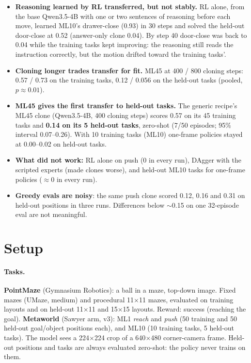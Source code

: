 \documentclass[11pt]{article}
\begin{document}
\begin{itemize}
  (ML10 rollouts 0.49 $\to$ 0.64 over 50 steps), but not held-out positions or tasks. Positive-only advantages hurt.
\item \textbf{Reasoning learned by RL transferred, but not stably.} RL alone, from the base Qwen3.5-4B with one or two
  sentences of reasoning before each move, learned ML10's drawer-close (0.93) in 30 steps and solved the held-out
  door-close at 0.52 (answer-only clone 0.04). By step 40 door-close was back to 0.04 while the training tasks kept
  improving: the reasoning still reads the instruction correctly, but the motion drifted toward the training tasks'.
\item \textbf{Cloning longer trades transfer for fit.} ML45 at 400 / 800 cloning steps: 0.57 / 0.73 on the training tasks,
  0.12 / 0.056 on the held-out tasks (pooled, $p\approx0.01$).
\item \textbf{ML45 gives the first transfer to held-out tasks.} The generic recipe's ML45 clone (Qwen3.5-4B, 400 cloning
  steps) scores 0.57 on its 45 training tasks and \textbf{0.14 on its 5 held-out tasks}, zero-shot (7/50 episodes; 95\%
  interval 0.07--0.26). With 10 training tasks (ML10) one-frame policies stayed at 0.00--0.02 on held-out tasks.
\item \textbf{What did not work:} RL alone on push (0 in every run), DAgger with the scripted experts (made clones worse),
  and held-out ML10 tasks for one-frame policies ($\approx$0 in every run).
\item \textbf{Greedy evals are noisy}: the same push clone scored 0.12, 0.16 and 0.31 on held-out positions in three
  runs. Differences below $\sim$0.15 on one 32-episode eval are not meaningful.
\end{itemize}

\tableofcontents
\newpage

\section{Setup}

\paragraph{Tasks.}
\textbf{PointMaze} (Gymnasium Robotics): a ball in a maze, top-down image. Fixed mazes (UMaze, medium) and procedural
11$\times$11 mazes, evaluated on training layouts and on held-out 11$\times$11 and 15$\times$15 layouts. Reward:
success (reaching the goal).
\textbf{Metaworld} (Sawyer arm, v3): ML1 \emph{reach} and \emph{push} (50 training and 50 held-out goal/object positions
each), and ML10 (10 training tasks, 5 held-out tasks). The model sees a 224$\times$224 crop of a 640$\times$480
corner-camera frame. Held-out positions and tasks are always evaluated zero-shot: the policy never trains on them.
\end{document}

